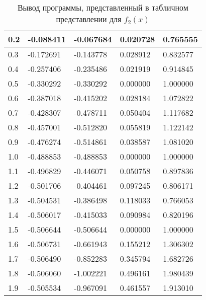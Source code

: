 \documentclass[13pt, a4paper, twoside]{article}
\begin{document}
\begin{table}[!ht]
\begin{tabular}{|l|l|l|l|l|}
        0.2 & -0.088411 & -0.067684 & 0.020728 & 0.765555 \\ \hline
        0.3 & -0.172691 & -0.143778 & 0.028912 & 0.832577 \\ \hline
        0.4 & -0.257406 & -0.235486 & 0.021919 & 0.914845 \\ \hline
        0.5 & -0.330292 & -0.330292 & 0.000000 & 1.000000 \\ \hline
        0.6 & -0.387018 & -0.415202 & 0.028184 & 1.072822 \\ \hline
        0.7 & -0.428307 & -0.478711 & 0.050404 & 1.117682 \\ \hline
        0.8 & -0.457001 & -0.512820 & 0.055819 & 1.122142 \\ \hline
        0.9 & -0.476274 & -0.514861 & 0.038587 & 1.081020 \\ \hline
        1.0 & -0.488853 & -0.488853 & 0.000000 & 1.000000 \\ \hline
        1.1 & -0.496829 & -0.446071 & 0.050758 & 0.897836 \\ \hline
        1.2 & -0.501706 & -0.404461 & 0.097245 & 0.806171 \\ \hline
        1.3 & -0.504531 & -0.386498 & 0.118033 & 0.766053 \\ \hline
        1.4 & -0.506017 & -0.415033 & 0.090984 & 0.820196 \\ \hline
        1.5 & -0.506644 & -0.506644 & 0.000000 & 1.000000 \\ \hline
        1.6 & -0.506731 & -0.661943 & 0.155212 & 1.306302 \\ \hline
        1.7 & -0.506490 & -0.852283 & 0.345794 & 1.682726 \\ \hline
        1.8 & -0.506060 & -1.002221 & 0.496161 & 1.980439 \\ \hline
        1.9 & -0.505534 & -0.967091 & 0.461557 & 1.913010 \\ \hline
    \end{tabular}
    \caption{Вывод программы, представленный в табличном представлении для $f_2(x)$}
\end{table}
\end{document}
